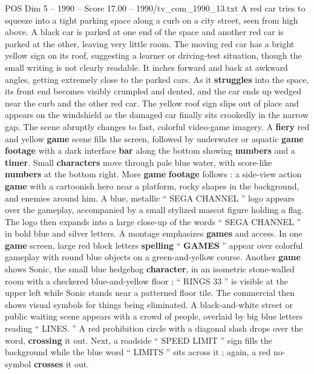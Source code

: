 \begin{textsample}{POS Dim 5 – 1990 – Score 17.00 – 1990/tv\_com\_1990\_13.txt}  \label{ex:f5_pos_004}
A red car tries to squeeze into a tight parking space along a curb on a city street, seen from high above.
A black car is parked at one end of the space and another red car is parked at the other, leaving very little room.
The moving red car has a bright yellow sign on its roof, suggesting a learner or driving-test situation, though the small writing is not clearly readable.
It inches forward and back at awkward angles, getting extremely close to the parked cars.
As it \textbf{struggles} into the space, its front end becomes visibly crumpled and dented, and the car ends up wedged near the curb and the other red car.
The yellow roof sign slips out of place and appears on the windshield as the damaged car finally sits crookedly in the narrow gap.
The scene abruptly changes to fast, colorful video-game imagery.
A \textbf{fiery} red and yellow \textbf{game} scene fills the screen, followed by underwater or aquatic \textbf{game} \textbf{footage} with a dark interface \textbf{bar} along the bottom showing \textbf{numbers} and a \textbf{timer}.
Small \textbf{characters} move through pale blue water, with score-like \textbf{numbers} at the bottom right.
More \textbf{game} \textbf{footage} follows : a side-view action \textbf{game} with a cartoonish hero near a platform, rocky shapes in the background, and enemies around him.
A blue, metallic “ SEGA CHANNEL ” logo appears over the gameplay, accompanied by a small stylized mascot figure holding a flag.
The logo then expands into a large close-up of the words “ SEGA CHANNEL ” in bold blue and silver letters.
A montage emphasizes \textbf{games} and access.
In one \textbf{game} screen, large red block letters \textbf{spelling} “ \textbf{GAMES} ” appear over colorful gameplay with round blue objects on a green-and-yellow course.
Another \textbf{game} shows Sonic, the small blue hedgehog \textbf{character}, in an isometric stone-walled room with a checkered blue-and-yellow floor ; “ RINGS 33 ” is visible at the upper left while Sonic stands near a patterned floor tile.
The commercial then shows visual symbols for things being eliminated.
A black-and-white street or public waiting scene appears with a crowd of people, overlaid by big blue letters reading “ LINES. ” A red prohibition circle with a diagonal slash drops over the word, \textbf{crossing} it out.
Next, a roadside “ SPEED LIMIT ” sign fills the background while the blue word “ LIMITS ” sits across it ; again, a red no-symbol \textbf{crosses} it out.

\end{textsample}
